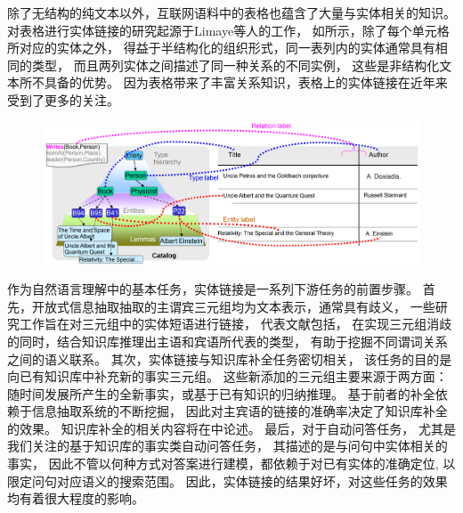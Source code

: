 除了无结构的纯文本以外，互联网语料中的表格也蕴含了大量与实体相关的知识。
对表格进行实体链接的研究起源于Limaye等人\cite{limaye2010annotating}的工作，
如所示，除了每个单元格所对应的实体之外，
得益于半结构化的组织形式，同一表列内的实体通常具有相同的类型，
而且两列实体之间描述了同一种关系的不同实例，
这些是非结构化文本所不具备的优势。
因为表格带来了丰富关系知识，表格上的实体链接在近年来受到了更多的关注。

\begin{figure}[th]
	\centering
    \includegraphics[width=0.95\columnwidth]{figure/rw/linking-limaye.png}
	\label{fig:rw-linking-limaye}
\end{figure}

作为自然语言理解中的基本任务，实体链接是一系列下游任务的前置步骤。
首先，开放式信息抽取抽取的主谓宾三元组均为文本表示，通常具有歧义，
一些研究工作旨在对三元组中的实体短语进行链接，
代表文献包括\parencite{nakashole2012patty,lin2012entity}，
在实现三元组消歧的同时，结合知识库推理出主语和宾语所代表的类型，
有助于挖掘不同谓词关系之间的语义联系。
其次，实体链接与知识库补全任务密切相关，
该任务的目的是向已有知识库中补充新的事实三元组。
这些新添加的三元组主要来源于两方面：
随时间发展所产生的全新事实，或基于已有知识的归纳推理。
基于前者的补全依赖于信息抽取系统的不断挖掘，
因此对主宾语的链接的准确率决定了知识库补全的效果。
知识库补全的相关内容将在中论述。
最后，对于自动问答任务，%
尤其是我们关注的基于知识库的事实类自动问答任务，
其描述的是与问句中实体相关的事实，
因此不管以何种方式对答案进行建模，都依赖于对已有实体的准确定位,
以限定问句对应语义的搜索范围。
因此，实体链接的结果好坏，对这些任务的效果均有着很大程度的影响。

